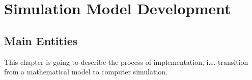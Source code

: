 \chapter{Simulation Model Development}


\section{Main Entities}

This chapter is going to describe the process of implementation, i.e. transition from a mathematical model to computer simulation.

\begin{figure}
    \centering
    \begin{subfigure}[b]{0.3\textwidth}

\end{subfigure}
\end{figure}

